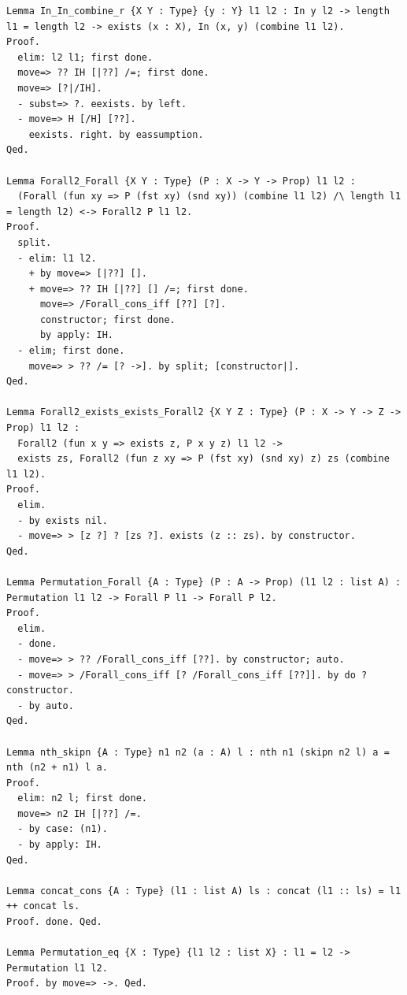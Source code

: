 \documentclass[10pt,a4paper]{article}
\begin{document}
\begin{lstlisting}[style=authorcoq]
Lemma In_In_combine_r {X Y : Type} {y : Y} l1 l2 : In y l2 -> length l1 = length l2 -> exists (x : X), In (x, y) (combine l1 l2).
Proof.
  elim: l2 l1; first done.
  move=> ?? IH [|??] /=; first done.
  move=> [?|/IH].
  - subst=> ?. eexists. by left.
  - move=> H [/H] [??].
    eexists. right. by eassumption.
Qed.

Lemma Forall2_Forall {X Y : Type} (P : X -> Y -> Prop) l1 l2 :
  (Forall (fun xy => P (fst xy) (snd xy)) (combine l1 l2) /\ length l1 = length l2) <-> Forall2 P l1 l2.
Proof.
  split.
  - elim: l1 l2.
    + by move=> [|??] [].
    + move=> ?? IH [|??] [] /=; first done.
      move=> /Forall_cons_iff [??] [?].
      constructor; first done.
      by apply: IH.
  - elim; first done.
    move=> > ?? /= [? ->]. by split; [constructor|].
Qed.

Lemma Forall2_exists_exists_Forall2 {X Y Z : Type} (P : X -> Y -> Z -> Prop) l1 l2 :
  Forall2 (fun x y => exists z, P x y z) l1 l2 ->
  exists zs, Forall2 (fun z xy => P (fst xy) (snd xy) z) zs (combine l1 l2).
Proof.
  elim.
  - by exists nil.
  - move=> > [z ?] ? [zs ?]. exists (z :: zs). by constructor.
Qed.

Lemma Permutation_Forall {A : Type} (P : A -> Prop) (l1 l2 : list A) : Permutation l1 l2 -> Forall P l1 -> Forall P l2.
Proof.
  elim.
  - done.
  - move=> > ?? /Forall_cons_iff [??]. by constructor; auto.
  - move=> > /Forall_cons_iff [? /Forall_cons_iff [??]]. by do ? constructor.
  - by auto.
Qed.

Lemma nth_skipn {A : Type} n1 n2 (a : A) l : nth n1 (skipn n2 l) a = nth (n2 + n1) l a.
Proof.
  elim: n2 l; first done.
  move=> n2 IH [|??] /=.
  - by case: (n1).
  - by apply: IH.
Qed.

Lemma concat_cons {A : Type} (l1 : list A) ls : concat (l1 :: ls) = l1 ++ concat ls.
Proof. done. Qed.

Lemma Permutation_eq {X : Type} {l1 l2 : list X} : l1 = l2 -> Permutation l1 l2.
Proof. by move=> ->. Qed.


\end{lstlisting}
\end{document}
